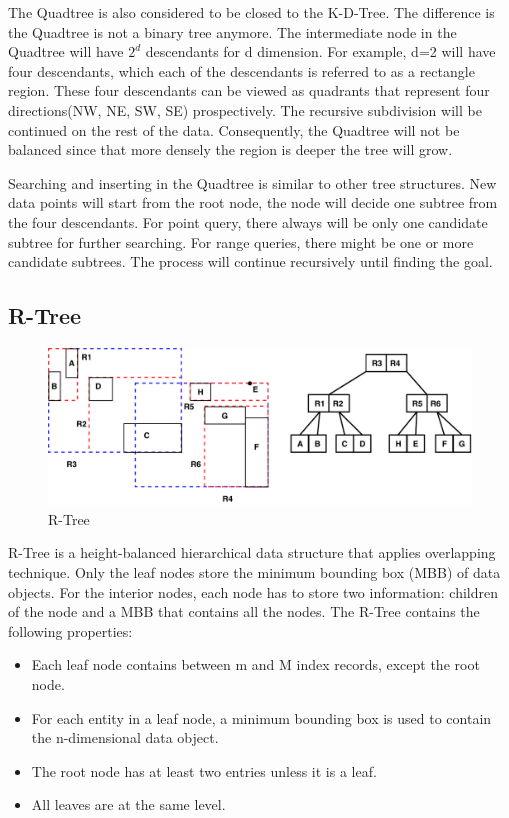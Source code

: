 The Quadtree \cite{CSUR:tm} is also considered to be closed to the K-D-Tree. The difference is the Quadtree is not a binary tree anymore. The intermediate node in the Quadtree will have ${2^d}$ descendants for d dimension. For example, d=2 will have four descendants, which each of the descendants is referred to as a rectangle region. These four descendants can be viewed as quadrants that represent four directions(NW, NE, SW, SE) prospectively. The recursive subdivision will be continued on the rest of the data. Consequently, the Quadtree will not be balanced since that more densely the region is deeper the tree will grow. 

Searching and inserting in the Quadtree is similar to other tree structures. New data points will start from the root node, the node will decide one subtree from the four descendants. For point query, there always will be only one candidate subtree for further searching. For range queries, there might be one or more candidate subtrees. The process will continue recursively until finding the goal.


\subsection{R-Tree}

\begin{figure}[ht]
\centering
\includegraphics[scale=0.75]{Figures/rtree.pdf}
\caption{R-Tree}
\label{fig:rtree}
\end{figure}

R-Tree\cite{Guttman:1984ka} is a height-balanced hierarchical data structure that applies overlapping technique. Only the leaf nodes store the minimum bounding box (MBB) of data objects. For the interior nodes, each node has to store two information: children of the node and a MBB that contains all the nodes. The R-Tree contains the following properties: 

\begin{itemize}
  \item Each leaf node contains between m and M index records, except the root node. 
  \item For each entity in a leaf node, a minimum bounding box is used to contain the n-dimensional data object.
  \item The root node has at least two entries unless it is a leaf.
  \item All leaves are at the same level.
\end{itemize}


